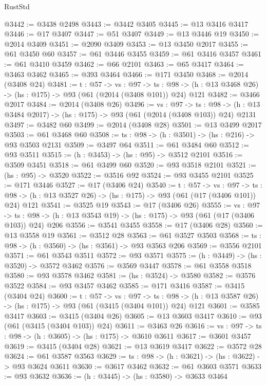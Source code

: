 \begin{lexlean}{RustStd}
\begin{coremodule}
@3442 := @3438 @2498
@3443 := @3442 @3405
@3445 := @13 @3416 @3417
@3446 := @17 @3407
@3447 := @51 @3407
@3449 := @13 @3446 @19
@3450 := @2014 @3409
@3451 := @2090 @3409
@3453 := @13 @3450 @2017
@3455 := @61 @3450 @60
@3457 := @61 @3446 @3455
@3459 := @61 @3416 @3457
@3461 := @61 @3410 @3459
@3462 := @66 @2101
@3463 := @65 @3417
@3464 := @3463 @3462
@3465 := @393 @3464
@3466 := @171 @3450
@3468 := @2014 (@3408 @24)
@3481 := {t : @57} ->
  {vs : @97} ->
  {ts : @98} -> (h : @13 @3468 @26) -> (hs : @175) -> @93 (@61 (@2014 (@3408 @101)) @24) @121
@3482 := @3466 @2017
@3484 := @2014 (@3408 @26)
@3496 := {vs : @97} ->
  {ts : @98} -> (h : @13 @3484 @2017) -> (hs : @175) -> @93 (@61 (@2014 (@3408 @103)) @24) @2131
@3497 := @3482 @60
@3499 := @2014 (@3408 @28)
@3501 := @13 @3499 @2017
@3503 := @61 @3468 @60
@3508 := {ts : @98} -> (h : @3501) -> (hs : @216) -> @93 @3503 @2131
@3509 := @3497 @64
@3511 := @61 @3484 @60
@3512 := @93 @3511
@3515 := (h : @3453) -> (hs : @95) -> @3512 @2101
@3516 := @3509 @3451
@3518 := @61 @3499 @60
@3520 := @93 @3518 @2101
@3521 := (hs : @95) -> @3520
@3522 := @3516 @92
@3524 := @93 @3455 @2101
@3525 := @171 @3446
@3527 := @17 (@3406 @24)
@3540 := {t : @57} ->
  {vs : @97} ->
  {ts : @98} -> (h : @13 @3527 @26) -> (hs : @175) -> @93 (@61 (@17 (@3406 @101)) @24) @121
@3541 := @3525 @19
@3543 := @17 (@3406 @26)
@3555 := {vs : @97} ->
  {ts : @98} -> (h : @13 @3543 @19) -> (hs : @175) -> @93 (@61 (@17 (@3406 @103)) @24) @206
@3556 := @3541 @3455
@3558 := @17 (@3406 @28)
@3560 := @13 @3558 @19
@3561 := @3512 @28
@3563 := @61 @3527 @3503
@3568 := {ts : @98} -> (h : @3560) -> (hs : @3561) -> @93 @3563 @206
@3569 := @3556 @2101
@3571 := @61 @3543 @3511
@3572 := @93 @3571
@3575 := (h : @3449) -> (hs : @3520) -> @3572 @3462
@3576 := @3569 @3447
@3578 := @61 @3558 @3518
@3580 := @93 @3578 @3462
@3581 := (hs : @3524) -> @3580
@3582 := @3576 @3522
@3584 := @93 @3457 @3462
@3585 := @171 @3416
@3587 := @3415 (@3404 @24)
@3600 := {t : @57} ->
  {vs : @97} ->
  {ts : @98} -> (h : @13 @3587 @26) -> (hs : @175) -> @93 (@61 (@3415 (@3404 @101)) @24) @121
@3601 := @3585 @3417
@3603 := @3415 (@3404 @26)
@3605 := @13 @3603 @3417
@3610 := @93 (@61 (@3415 (@3404 @103)) @24)
@3611 := @3463 @26
@3616 := {vs : @97} -> {ts : @98} -> (h : @3605) -> (hs : @175) -> @3610 @3611
@3617 := @3601 @3457
@3619 := @3415 (@3404 @28)
@3621 := @13 @3619 @3417
@3622 := @3572 @28
@3624 := @61 @3587 @3563
@3629 := {ts : @98} -> (h : @3621) -> (hs : @3622) -> @93 @3624 @3611
@3630 := @3617 @3462
@3632 := @61 @3603 @3571
@3633 := @93 @3632
@3636 := (h : @3445) -> (hs : @3580) -> @3633 @3464

\end{coremodule}
\end{lexlean}
